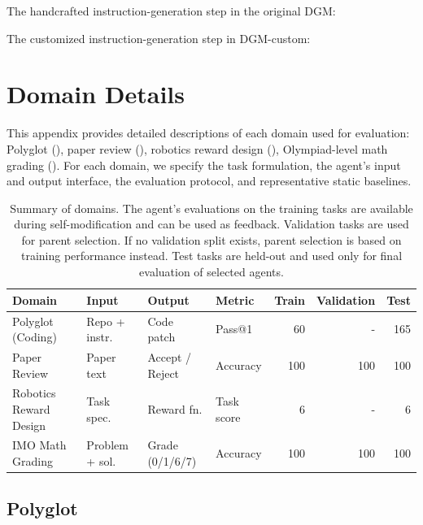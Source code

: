 \documentclass[]{fairmeta}
\begin{document}
The handcrafted instruction-generation step in the original DGM:


The customized instruction-generation step in DGM-custom:


\section{Domain Details}
\label{app:domain-details}

This appendix provides detailed descriptions of each domain used for evaluation: Polyglot (), paper review (), robotics reward design (), Olympiad-level math grading (). For each domain, we specify the task formulation, the agent's input and output interface, the evaluation protocol, and representative static baselines.

\begin{table}[H]
\centering
\small
\setlength{\tabcolsep}{4pt}
\begin{tabular}{l l l l r r r}
\toprule
\textbf{Domain} & \textbf{Input} & \textbf{Output} & \textbf{Metric} & \textbf{Train} & \textbf{Validation} & \textbf{Test} \\
\midrule
Polyglot (Coding) & Repo + instr. & Code patch & Pass@1 & 60 & - & 165 \\
Paper Review & Paper text & Accept / Reject & Accuracy & 100 & 100 & 100 \\
Robotics Reward Design & Task spec. & Reward fn. & Task score & 6 & - & 6 \\
IMO Math Grading & Problem + sol. & Grade (0/1/6/7) & Accuracy & 100 & 100 & 100 \\
\bottomrule
\end{tabular}
\caption{Summary of domains. The agent's evaluations on the training tasks are available during self-modification and can be used as feedback. Validation tasks are used for parent selection. If no validation split exists, parent selection is based on training performance instead. Test tasks are held-out and used only for final evaluation of selected agents.}
\label{tab:domain-summary}
\end{table}

\subsection{Polyglot}
\label{app:domain-polyglot}
\end{document}
